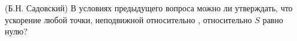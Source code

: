 (Б.Н. Садовский)
В условиях предыдущего вопроса можно ли утверждать, что ускорение
любой точки, неподвижной относительно  , относительно $S$ равно нулю?
